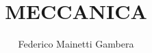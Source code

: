   
\title{MECCANICA}
\author{Federico Mainetti Gambera}
\usepackage{amsmath}
\usepackage{amssymb}
\usepackage{graphicx}
\usepackage[italian]{babel}
\usepackage{import}
\usepackage{xifthen}
\usepackage{pdfpages}
\usepackage{transparent}
\usepackage{xcolor}
\usepackage[a4paper,left=35mm,top=26mm,right=26mm,bottom=15mm]{geometry}
\usepackage{color}
\usepackage{tcolorbox}
\usepackage{hyperref}
\renewcommand{\familydefault}{\sfdefault}

\newcommand{\incfig}[1]{%
    \def\svgwidth{\columnwidth}
    {#1.pdf_tex}
}